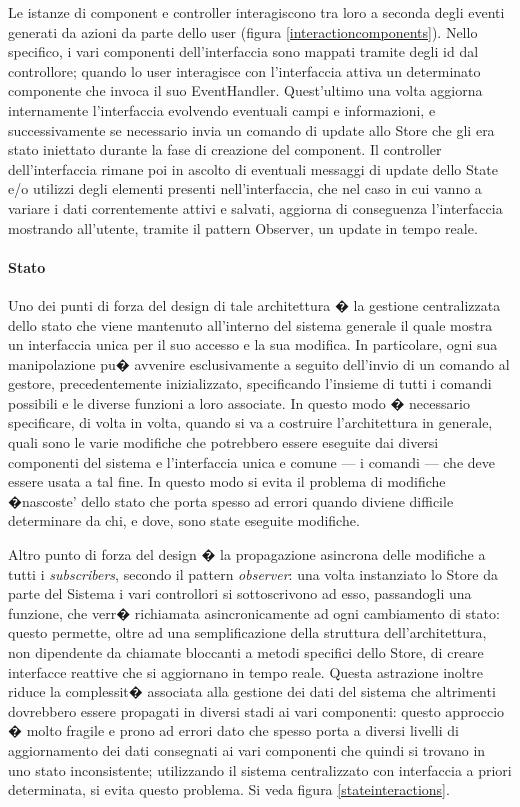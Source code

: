 \documentclass[final, smallexted]{svjour3}
\begin{document}
Le istanze di component e controller interagiscono tra loro a seconda degli eventi generati da azioni da parte dello user (figura \ref{interactioncomponents}). Nello specifico, i vari componenti dell'interfaccia sono mappati tramite degli id dal controllore; quando lo user interagisce con l'interfaccia attiva un determinato componente che invoca il suo EventHandler. Quest'ultimo una volta aggiorna internamente l'interfaccia evolvendo eventuali campi e informazioni, e successivamente se necessario invia un comando di update allo Store che gli era stato iniettato durante la fase di creazione del component. Il controller dell'interfaccia rimane poi in ascolto di eventuali messaggi di update dello State e/o utilizzi degli elementi presenti nell'interfaccia, che nel caso in cui vanno a variare i dati correntemente attivi e salvati, aggiorna di conseguenza l'interfaccia mostrando all'utente, tramite il pattern Observer, un update in tempo reale.
 
\paragraph{\textbf{Stato}} Uno dei punti di forza del design di tale architettura � la gestione centralizzata dello stato che viene mantenuto all'interno del sistema generale il quale mostra un interfaccia unica per il suo accesso e la sua modifica. In particolare, ogni sua manipolazione pu� avvenire esclusivamente a seguito dell'invio di un comando al gestore, precedentemente inizializzato, specificando l'insieme di tutti i comandi possibili e le diverse funzioni a loro associate.
In questo modo � necessario specificare, di volta in volta, quando si va a costruire l'architettura in generale, quali sono le varie modifiche che potrebbero essere eseguite dai diversi componenti del sistema e l'interfaccia unica e comune --- i comandi --- che deve essere usata a tal fine. In questo modo si evita il problema di modifiche �nascoste' dello stato che porta spesso ad errori quando diviene difficile determinare da chi, e dove, sono state eseguite modifiche.

Altro punto di forza del design � la propagazione asincrona delle modifiche a tutti i \textit{subscribers}, secondo il pattern \textit{observer}: una volta instanziato lo Store da parte del Sistema i vari controllori si sottoscrivono ad esso, passandogli una funzione, che verr� richiamata asincronicamente ad ogni cambiamento di stato: questo permette, oltre ad una semplificazione della struttura dell'architettura, non dipendente da chiamate bloccanti a metodi specifici dello Store, di creare interfacce reattive che si aggiornano in tempo reale. Questa astrazione inoltre riduce la complessit� associata alla gestione dei dati del sistema che altrimenti dovrebbero essere propagati in diversi stadi ai vari componenti: questo approccio � molto fragile e prono ad errori dato che spesso porta a diversi livelli di aggiornamento dei dati consegnati ai vari componenti che quindi si trovano in uno stato inconsistente; utilizzando il sistema centralizzato con interfaccia a priori determinata, si evita questo problema. Si veda figura \ref{stateinteractions}.
\end{document}
